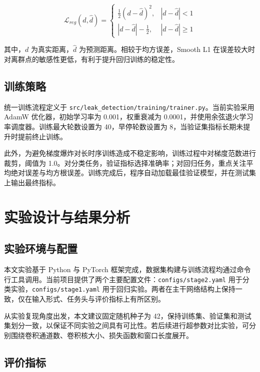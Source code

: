 \begin{equation}
\mathcal{L}_{reg}(d,\hat{d}) =
\left\{
\begin{array}{ll}
\frac{1}{2}(d-\hat{d})^2, & |d-\hat{d}| < 1 \\
|d-\hat{d}| - \frac{1}{2}, & |d-\hat{d}| \geq 1
\end{array}
\right.
\end{equation}

其中，$d$ 为真实距离，$\hat{d}$ 为预测距离。相较于均方误差，Smooth L1 在误差较大时对离群点的敏感性更低，有利于提升回归训练的稳定性。

\section{训练策略}

统一训练流程定义于 \texttt{src/leak\_detection/training/trainer.py}。当前实验采用 AdamW 优化器，初始学习率为 0.001，权重衰减为 0.0001，并使用余弦退火学习率调度器。训练最大轮数设置为 40，早停轮数设置为 8，当验证集指标长期未提升时提前终止训练。

此外，为避免梯度爆炸对长时序训练造成不稳定影响，训练过程中对梯度范数进行裁剪，阈值为 1.0。对分类任务，验证指标选择准确率；对回归任务，重点关注平均绝对误差与均方根误差。训练完成后，程序自动加载最佳验证模型，并在测试集上输出最终指标。

\chapter{实验设计与结果分析}

\section{实验环境与配置}

本文实验基于 Python 与 PyTorch 框架完成，数据集构建与训练流程均通过命令行工具调用。当前项目提供了两个主要配置文件：\texttt{configs/stage2.yaml} 用于分类实验，\texttt{configs/stage1.yaml} 用于回归实验。两者在主干网络结构上保持一致，仅在输入形式、任务头与评价指标上有所区别。

从实验复现角度出发，本文建议固定随机种子为 42，保持训练集、验证集和测试集划分一致，以保证不同实验之间具有可比性。若后续进行超参数对比实验，可分别围绕卷积通道数、卷积核大小、损失函数和窗口长度展开。

\section{评价指标}

